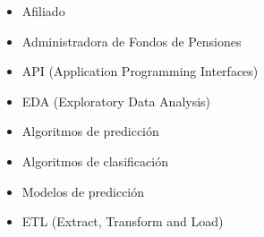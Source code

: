 \begin{itemize}
    \item Afiliado
    \item Administradora de Fondos de Pensiones
    \item API (Application Programming Interfaces)
    \item EDA (Exploratory Data Analysis)
    \item Algoritmos de predicción
    \item Algoritmos de clasificación
    \item Modelos de predicción
    \item ETL (Extract, Transform and Load)
\end{itemize}